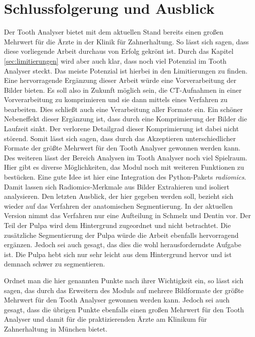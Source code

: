 \chapter{Schlussfolgerung und Ausblick}
\label{chap:schlussfolgerung} Der Tooth Analyser bietet mit dem aktuellen Stand bereits
einen großen Mehrwert für die Ärzte in der Klinik für Zahnerhaltung. So lässt
sich sagen, dass diese vorliegende Arbeit durchaus von Erfolg gekrönt ist. Durch
das Kapitel \ref{sec:limitierungen} wird aber auch klar, dass noch viel Potenzial
im Tooth Analyser steckt. Das meiste Potenzial ist hierbei in den Limitierungen
zu finden. Eine hervorragende Ergänzung dieser Arbeit würde eine Vorverarbeitung
der Bilder bieten. Es soll also in Zukunft möglich sein, die \ac{CT}-Aufnahmen
in einer Vorverarbeitung zu komprimieren und sie dann mittels eines Verfahren zu
bearbeiten. Dies schließt auch eine Verarbeitung aller Formate ein. Ein schöner
Nebeneffekt dieser Ergänzung ist, dass durch eine Komprimierung der Bilder die Laufzeit
sinkt. Der verlorene Detailgrad dieser Komprimierung ist dabei nicht störend. Somit
lässt sich sagen, dass durch das Akzeptieren unterschiedlicher Formate der
größte Mehrwert für den Tooth Analyser gewonnen werden kann. Des weiteren lässt der
Bereich Analysen im Tooth Analyser noch viel Spielraum. Hier gibt es diverse
Möglichkeiten, das Modul noch mit weiteren Funktionen zu bestücken. Eine gute
Idee ist hier eine Integration des Python-Pakets \textit{radiomics}. Damit
lassen sich Radiomics-Merkmale aus Bilder Extrahieren und isoliert analysieren. Den
letzten Ausblick, der hier gegeben werden soll, bezieht sich wieder auf das Verfahren
der anatomischen Segmentierung. In der aktuellen Version nimmt das Verfahren nur
eine Aufteilung in Schmelz und Dentin vor. Der Teil der Pulpa wird dem Hintergrund
zugeordnet und nicht betrachtet. Die zusätzliche Segmentierung der Pulpa würde
die Arbeit ebenfalls hervorragend ergänzen. Jedoch sei auch gesagt, das dies die
wohl herausforderndste Aufgabe ist. Die Pulpa hebt sich nur sehr leicht aus dem Hintergrund
hervor und ist demnach schwer zu segmentieren.

Ordnet man die hier genannten Punkte nach ihrer Wichtigkeit ein, so lässt sich
sagen, das durch das Erweitern des Moduls auf mehrere Bildformate der größte Mehrwert
für den Tooth Analyser gewonnen werden kann. Jedoch sei auch gesagt, dass die übrigen
Punkte ebenfalls einen großen Mehrwert für den Tooth Analyser und damit für die praktizierenden
Ärzte am Klinikum für Zahnerhaltung in München bietet.
